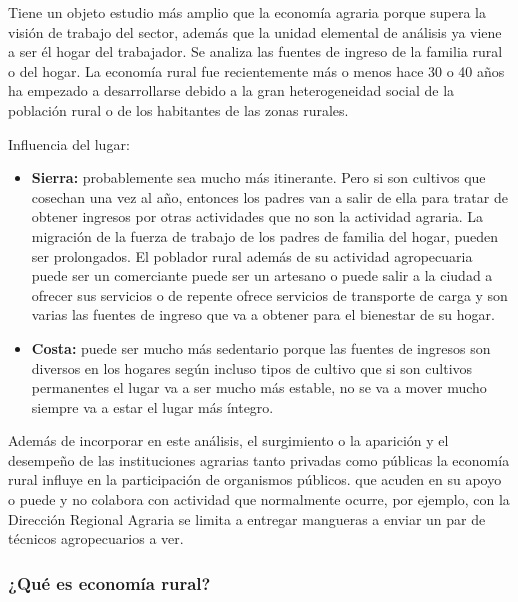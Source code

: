 \documentclass[
  letterpaper,
  DIV=11,
  numbers=noendperiod]{scrartcl}
\begin{document}
Tiene un objeto estudio más amplio que la economía agraria porque supera
la visión de trabajo del sector, además que la unidad elemental de
análisis ya viene a ser él hogar del trabajador. Se analiza las fuentes
de ingreso de la familia rural o del hogar. La economía rural fue
recientemente más o menos hace 30 o 40 años ha empezado a desarrollarse
debido a la gran heterogeneidad social de la población rural o de los
habitantes de las zonas rurales.

Influencia del lugar:

\begin{itemize}
\item
  \textbf{Sierra:} probablemente sea mucho más itinerante. Pero si son
  cultivos que cosechan una vez al año, entonces los padres van a salir
  de ella para tratar de obtener ingresos por otras actividades que no
  son la actividad agraria. La migración de la fuerza de trabajo de los
  padres de familia del hogar, pueden ser prolongados. El poblador rural
  además de su actividad agropecuaria puede ser un comerciante puede ser
  un artesano o puede salir a la ciudad a ofrecer sus servicios o de
  repente ofrece servicios de transporte de carga y son varias las
  fuentes de ingreso que va a obtener para el bienestar de su hogar.
\item
  \textbf{Costa:} puede ser mucho más sedentario porque las fuentes de
  ingresos son diversos en los hogares según incluso tipos de cultivo
  que si son cultivos permanentes el lugar va a ser mucho más estable,
  no se va a mover mucho siempre va a estar el lugar más íntegro.
\end{itemize}

Además de incorporar en este análisis, el surgimiento o la aparición y
el desempeño de las instituciones agrarias tanto privadas como públicas
la economía rural influye en la participación de organismos públicos.
que acuden en su apoyo o puede y no colabora con actividad que
normalmente ocurre, por ejemplo, con la Dirección Regional Agraria se
limita a entregar mangueras a enviar un par de técnicos agropecuarios a
ver.

\hypertarget{quuxe9-es-economuxeda-rural}{%
\subsubsection{¿Qué es economía
rural?}\label{quuxe9-es-economuxeda-rural}}
\end{document}
